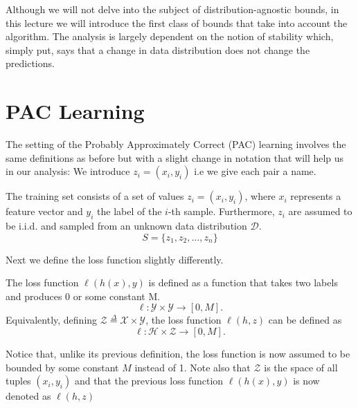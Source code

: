 \documentclass{article}
\begin{document}
Although we will not delve into the subject of distribution-agnostic bounds, in this lecture we will introduce the first class of bounds that take into account the algorithm. The analysis is largely dependent on the notion of stability which, simply put, says that a change in data distribution does not change the predictions. 



\section{PAC Learning}
The setting of the Probably Approximately Correct (PAC) learning involves the same definitions as before but with a slight change in notation that will help us in our analysis: We introduce $z_i=(x_i,y_i)$ i.e we give each pair a name. 

\begin{defn}
The training set consists of a set of values $z_i=(x_i,y_i)$, where $x_i$ represents a feature vector and $y_i$ the label of the $i$-th sample. Furthermore, $z_i$ are assumed to be i.i.d. and sampled from an unknown data distribution $\mathcal{D}$. 
\[
	S = \{z_1, z_2, \dots, z_n\}
\]
\end{defn}
 Next we define the loss function slightly differently. 
\begin{defn} The loss function $\ell(h(x),y)$ is defined as a function that takes two labels and produces 0 or some constant M. 
\[
	\ell: \mathcal{Y} \times \mathcal{Y} \longrightarrow [0,M].
\]
Equivalently, defining $\mathcal{Z}\overset{\Delta}{=}\mathcal{X}\times \mathcal{Y}$,  the loss function $\ell (h,z)$  can be defined as 
\[
	\ell: \mathcal{H} \times \mathcal{Z} \longrightarrow [0,M].
\]
\end{defn}
Notice that, unlike its previous definition, the loss function is now assumed to be bounded by some constant $M$ instead of 1. 
Note also that $\mathcal{Z}$ is the space of all tuples $(x_i,y_i) $ and that the previous loss function $\ell(h(x),y)$ is now denoted as $\ell(h,z)$
\end{document}
